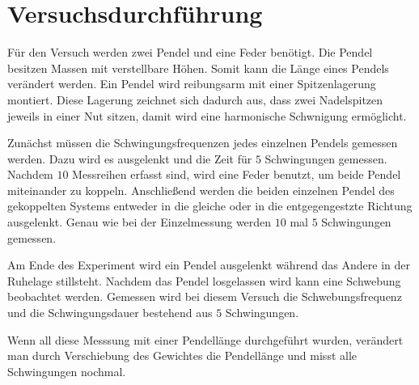 \section{Versuchsdurchführung}
Für den Versuch werden zwei Pendel und eine Feder benötigt.
Die Pendel besitzen Massen mit verstellbare Höhen.
Somit kann die Länge eines Pendels verändert werden.
Ein Pendel wird reibungsarm mit einer Spitzenlagerung
montiert. Diese Lagerung zeichnet sich dadurch aus, dass zwei Nadelspitzen jeweils 
in einer Nut sitzen, damit wird eine harmonische Schwnigung ermöglicht.

Zunächst müssen die Schwingungsfrequenzen jedes einzelnen Pendels 
gemessen werden. Dazu wird es ausgelenkt und die Zeit für $5$ Schwingungen gemessen.
Nachdem $10$ Messreihen erfasst sind, wird eine Feder benutzt, um beide 
Pendel miteinander zu koppeln.
Anschließend werden die beiden einzelnen Pendel des gekoppelten Systems entweder 
in die gleiche oder in die entgegengestzte Richtung ausgelenkt.
Genau wie bei der Einzelmessung werden $10$ mal $5$ Schwingungen gemessen.

Am Ende des Experiment wird ein Pendel ausgelenkt während das Andere 
in der Ruhelage stillsteht. Nachdem das Pendel losgelassen wird kann eine Schwebung 
beobachtet werden. Gemessen wird bei diesem Versuch die Schwebungsfrequenz und die Schwingungsdauer bestehend aus
$5$ Schwingungen.

Wenn all diese Messsung mit einer Pendellänge durchgeführt wurden, verändert man durch Verschiebung des 
Gewichtes die Pendellänge und misst alle Schwingungen nochmal.